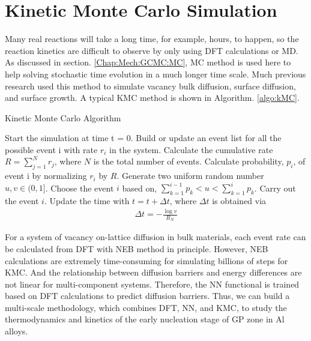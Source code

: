 \section{Kinetic Monte Carlo Simulation}
\label{chap:meth:KMC}

Many real reactions will take a long time, for example, hours, to happen, so the reaction kinetics are difficult to observe by only using \ac{DFT} calculations or \ac{MD}. As discussed in section. \ref{Chap:Mech:GCMC:MC}, \ac{MC} method is used here to help solving stochastic time evolution in a much longer time scale. Much previous research used this method to simulate vacancy bulk diffusion, surface diffusion, and surface growth. \cite{frenkel2001understanding, leach2001molecular} A typical \ac{KMC} method is shown in Algorithm. \ref{algo:kMC}.

\begin{algorithm}
  \caption{Kinetic Monte Carlo Algorithm}\label{algo:kMC}
  \begin{algorithmic}[1]
    \State Start the simulation at time t = 0.
        \State Build or update an event list for all the possible event i with rate $r_i$ in the system.
        \State Calculate the cumulative rate $R = \sum_{j=1}^N r_j$,
            where $N$ is the total number of events. 
        \State Calculate probability, $p_i$, of event i by normalizing $r_i$ by $R$.
        \State Generate two uniform random number $u, v \in (0, 1]$.
        \State Choose the event $i$ based on,
               $\sum_{k=1}^{i-1} p_k < u < \sum_{k=1}^{i} p_k$.
        \State Carry out the event $i$.
        \State Update the time with $t = t + \Delta t$,
            where $\Delta t$ is obtained via
            \begin{align}
                \Delta t = - \frac{\log{v}}{R_N}
            \label{Chap:Meth:eq:KMC:1}
            \end{align}
    \EndWhile
\end{algorithmic}
\end{algorithm}

For a system of vacancy on-lattice diffusion in bulk materials, each event rate can be calculated from \ac{DFT} with \ac{NEB} method in principle. However, \ac{NEB} calculations are extremely time-consuming for simulating billions of steps for \ac{KMC}. And the relationship between diffusion barriers and energy differences are not linear for multi-component systems. Therefore, the \ac{NN} functional is trained based on \ac{DFT} calculations to predict diffusion barriers. Thus, we can build a multi-scale methodology, which combines \ac{DFT}, \ac{NN}, and \ac{KMC}, to study the thermodynamics and kinetics of the early nucleation stage of GP zone in Al alloys.